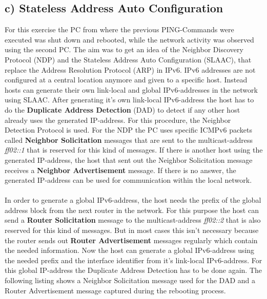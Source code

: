 \subsection{c) Stateless Address Auto Configuration}
For this exercise the PC from where the previous PING-Commands were executed was shut down and rebooted, while the network activity was observed using the second PC. The aim was to get an idea of the Neighbor Discovery Protocol (NDP) and the Stateless Address Auto Configuration (SLAAC), that replace the Address Resolution Protocol (ARP) in IPv6. IPv6 addresses are not configured at a central location anymore and given to a specific host. Instead hosts can generate their own link-local and global IPv6-addresses in the network using SLAAC. After generating it's own link-local IPv6-address the host has to do the \textbf{Duplicate Address Detection} (DAD) to detect if any other host already uses the generated IP-address. For this procedure, the Neighbor Detection Protocol is used. For the NDP the PC uses specific ICMPv6 packets called \textbf{Neighbor Solicitation} messages that are sent to the multicast-address \textit{ff02::1} that is reserved for this kind of messages. If there is another host using the generated IP-address, the host that sent out the Neighbor Solicitation message receives a \textbf{Neighbor Advertisement} message. If there is no answer, the generated IP-address  can be used for communication within the local network.
\\\\
In order to generate a global IPv6-address, the host needs the prefix of the global address block from the next router in the network. For this purpose the host can send a \textbf{Router Solicitation} message to the multicast-address \textit{ff02::2} that is also reserved for this kind of messages. But in most cases this isn't necessary because the router sends out \textbf{Router Advertisement} messages regularly which contain the needed information. Now the host can generate a global IPv6-address using the needed prefix and the interface identifier from it's link-local IPv6-address. For this global IP-address the Duplicate Address Detection has to be done again. The following listing shows a Neighbor Solicitation message used for the DAD and a Router Advertisement message captured during the rebooting process.
\\

